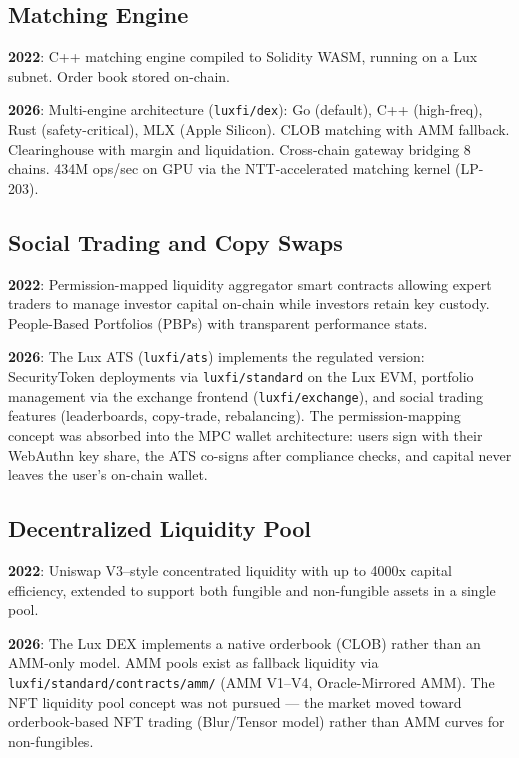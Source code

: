 \documentclass[11pt,a4paper]{article}
\begin{document}
\subsection{Matching Engine}

\textbf{2022}: C++ matching engine compiled to Solidity WASM,
running on a Lux subnet. Order book stored on-chain.

\textbf{2026}: Multi-engine architecture
(\texttt{luxfi/dex}): Go (default), C++ (high-freq), Rust
(safety-critical), MLX (Apple Silicon). CLOB matching with
AMM fallback. Clearinghouse with margin and liquidation.
Cross-chain gateway bridging 8 chains. 434M ops/sec on GPU
via the NTT-accelerated matching kernel (LP-203).

\subsection{Social Trading and Copy Swaps}

\textbf{2022}: Permission-mapped liquidity aggregator smart
contracts allowing expert traders to manage investor capital
on-chain while investors retain key custody. People-Based
Portfolios (PBPs) with transparent performance stats.

\textbf{2026}: The Lux ATS (\texttt{luxfi/ats}) implements the
regulated version: SecurityToken deployments via \texttt{luxfi/standard}
on the Lux EVM, portfolio management via the exchange frontend
(\texttt{luxfi/exchange}), and social trading features
(leaderboards, copy-trade, rebalancing). The permission-mapping
concept was absorbed into the MPC wallet architecture: users
sign with their WebAuthn key share, the ATS co-signs after
compliance checks, and capital never leaves the user's
on-chain wallet.

\subsection{Decentralized Liquidity Pool}

\textbf{2022}: Uniswap V3--style concentrated liquidity with
up to 4000x capital efficiency, extended to support both
fungible and non-fungible assets in a single pool.

\textbf{2026}: The Lux DEX implements a native orderbook
(CLOB) rather than an AMM-only model. AMM pools exist as
fallback liquidity via \texttt{luxfi/standard/contracts/amm/}
(AMM V1--V4, Oracle-Mirrored AMM). The NFT liquidity pool
concept was not pursued --- the market moved toward
orderbook-based NFT trading (Blur/Tensor model) rather than
AMM curves for non-fungibles.
\end{document}
